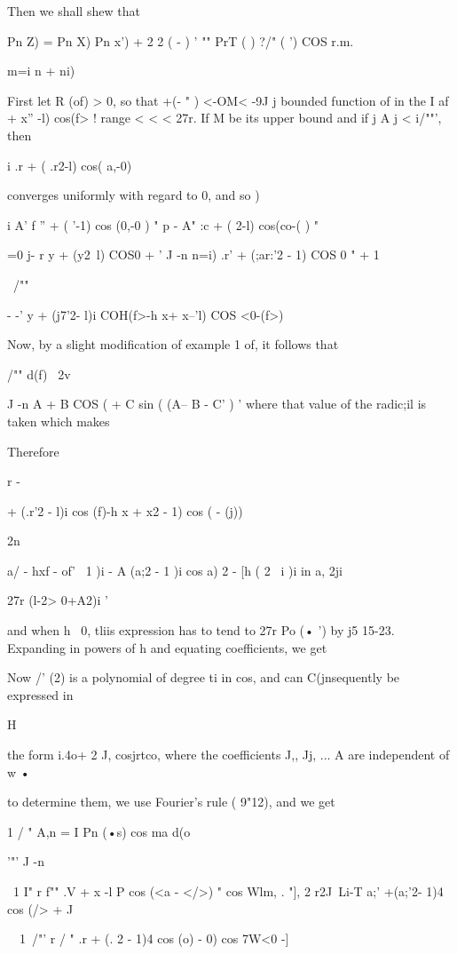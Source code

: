 {{{%
%

Then we shall shew that

Pn Z) = Pn X) Pn x') + 2 2 ( - ) ' "" PrT ( ) ?/" ( ') COS r.m.

m=i n + ni) \

First let R (of) > 0, so that +(- " ) <-OM< -9J j bounded function of
in the I af + x'' -l) cos(f> ! range < < < 27r. If M be its upper
bound and if j A j < i/""', then

i .r + ( .r2-l) cos( a,-0)

converges uniformly with regard to 0, and so )

i A' f '' + ( '-1) cos (0,-0 ) " p - A" :c + ( 2-l) cos(co-( ) "

 =0 j- r y + (y2\ l) COS0 + ' J -n n=i) .r' + (;ar:'2 - 1) COS 0 " + 1

\ /""

- -' y + (j7'2- l)i COH(f>-h x+ x--'l) COS <0-(f>)

Now, by a slight modification of example 1 of, it follows that

/"" d(f) \ 2v

J -n A + B COS ( + C sin ( (A-- B - C' ) ' where that value of the
radic;il is taken which makes

Therefore

r -

+ (.r'2 - l)i cos (f)-h x + x2 - 1) cos ( - (j))

2n

  a/ - hxf - of' \ 1 )i - A (a;2 - 1 )i cos a) 2 - [h ( 2 \ i )i in a,
2ji

27r (l-2> 0+A2)i '

and when h~ 0, tliis expression has to tend to 27r Po (• ') by j5
15-23. Expanding in powers of h and equating coefficients, we get

Now /' (2) is a polynomial of degree ti in cos, and can C(jnsequently
be expressed in

H

the form i.4o+ 2 J, cosjrtco, where the coefficients J,, Jj, ... A
are independent of w •

to determine them, we use Fourier's rule ( 9"12), and we get

1 / " A,n = I Pn (•s) cos ma d(o

'"' J -n

\ 1 I" r f"" .V + x -l P cos (<a - </>) " cos Wlm, . "], 2 r2J\ Li-T
a;' +(a;'2- 1)4 cos (/> + J

\ \ 1\ /"' r / " .r + (. 2 - 1)4 cos (o) - 0) cos 7W<0 -]

}}}
